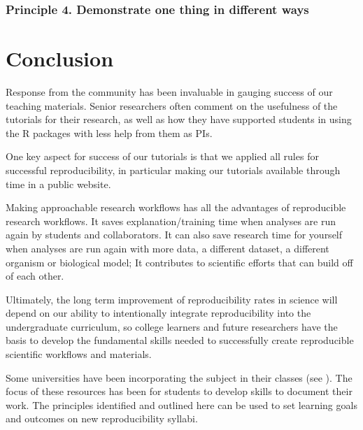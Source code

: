 \documentclass[12pt]{article}
\begin{document}
\subsubsection*{Principle 4. Demonstrate one thing in different ways}








\section*{Conclusion}
\label{sec:conclusion}

Response from the community has been invaluable in gauging success of our teaching
materials.
Senior researchers often comment on the usefulness
of the tutorials for their research, as well as how they have supported students in using the
R packages with less help from them as PIs.

One key aspect for success of our tutorials is that we applied all rules for
successful reproducibility, in particular making our tutorials available
through time in a public website.

Making approachable research workflows has all the advantages of reproducible research
workflows.
It saves explanation/training time when analyses are run again by students and
collaborators.
It can also save research time for yourself when analyses are run again with more
data, a different dataset, a different organism or biological model;
It contributes to scientific efforts that can build off of each other.

Ultimately, the long term improvement of reproducibility rates in science will depend
on our ability to intentionally integrate reproducibility into the
undergraduate curriculum, so college learners and future researchers have the
basis to develop the fundamental skills needed to successfully create reproducible
scientific workflows and materials.

Some universities have been incorporating the subject in their classes (see
\cite{uwlibraries2022, nigms2022}).
The focus of these resources has been for students to develop skills to document their work.
The principles identified and outlined here can be used to set learning goals and
outcomes on new reproducibility syllabi.
\end{document}
